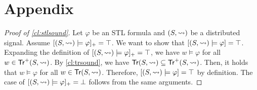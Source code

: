 \section*{Appendix}

\begin{proof}[Proof of \cref{cl:stlsound}]
	Let $\varphi$ be an STL formula and $(S,{\rightsquigarrow})$ be a distributed signal.
	Assume $[(S,{\rightsquigarrow}) \models \varphi]_+ = \top$.
	We want to show that $[(S,{\rightsquigarrow}) \models \varphi] = \top$.
	Expanding the definition of $[(S,{\rightsquigarrow}) \models \varphi]_+ = \top$, we have $w \models \varphi$ for all $w \in \mathsf{Tr}^+(S,{\rightsquigarrow})$.
	By \cref{cl:trsound}, we have $\mathsf{Tr}(S,{\rightsquigarrow}) \subseteq \mathsf{Tr}^+(S,{\rightsquigarrow})$.
	Then, it holds that $w \models \varphi$ for all $w \in \mathsf{Tr}(S,{\rightsquigarrow})$.
	Therefore, $[(S,{\rightsquigarrow}) \models \varphi] = \top$ by definition.
	The case of $[(S,{\rightsquigarrow}) \models \varphi]_+ = \bot$ follows from the same arguments.
\end{proof}

